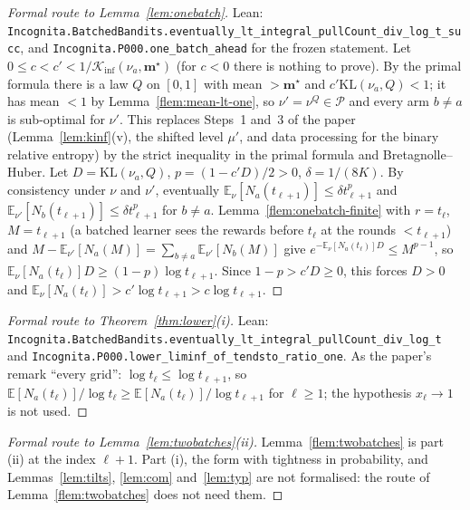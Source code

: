 \documentclass[11pt]{article}
\newcommand{\E}{\mathbb{E}}
\newcommand{\KL}{\mathrm{KL}}
\newcommand{\Kinf}{\mathcal K_{\inf}}
\newcommand{\cP}{\mathcal P}
\begin{document}
\begin{proof}[Formal route to Lemma~\ref{lem:onebatch}]
Lean: \texttt{Incognita.BatchedBandits.eventually\_lt\_integral\_pullCount\_div\_log\_t\_succ}, and
\texttt{Incognita.P000.one\_batch\_ahead} for the frozen statement. Let
$0\le c<c'<1/\Kinf(\nu_a,\mathbf m^\star)$ (for $c<0$ there is nothing to prove). By the primal
formula there is a law $Q$ on $[0,1]$ with mean $>\mathbf m^\star$ and $c'\KL(\nu_a,Q)<1$; it has
mean $<1$ by Lemma~\ref{flem:mean-lt-one}, so $\nu'=\nu^Q\in\cP$ and every arm $b\ne a$ is
sub-optimal for $\nu'$. This replaces Steps~1 and~3 of the paper (Lemma~\ref{lem:kinf}(v), the
shifted level $\mu'$, and data processing for the binary relative entropy) by the strict
inequality in the primal formula and Bretagnolle--Huber. Let $D=\KL(\nu_a,Q)$, $p=(1-c'D)/2>0$,
$\delta=1/(8K)$. By consistency under $\nu$ and $\nu'$, eventually
$\E_\nu[N_a(t_{\ell+1})]\le\delta t_{\ell+1}^p$ and $\E_{\nu'}[N_b(t_{\ell+1})]\le\delta t_{\ell+1}^p$
for $b\ne a$. Lemma~\ref{flem:onebatch-finite} with $r=t_\ell$, $M=t_{\ell+1}$ (a batched learner
sees the rewards before $t_\ell$ at the rounds $<t_{\ell+1}$) and
$M-\E_{\nu'}[N_a(M)]=\sum_{b\ne a}\E_{\nu'}[N_b(M)]$ give $e^{-\E_\nu[N_a(t_\ell)]D}\le M^{p-1}$,
so $\E_\nu[N_a(t_\ell)]D\ge(1-p)\log t_{\ell+1}$. Since $1-p>c'D\ge0$, this forces $D>0$ and
$\E_\nu[N_a(t_\ell)]>c'\log t_{\ell+1}>c\log t_{\ell+1}$.
\end{proof}

\begin{proof}[Formal route to Theorem~\ref{thm:lower}(i)]
Lean: \texttt{Incognita.BatchedBandits.eventually\_lt\_integral\_pullCount\_div\_log\_t} and
\texttt{Incognita.P000.lower\_liminf\_of\_tendsto\_ratio\_one}. As the paper's remark ``every grid'':
$\log t_\ell\le\log t_{\ell+1}$, so $\E[N_a(t_\ell)]/\log t_\ell\ge\E[N_a(t_\ell)]/\log t_{\ell+1}$ for
$\ell\ge1$; the hypothesis $x_\ell\to1$ is not used.
\end{proof}

\begin{proof}[Formal route to Lemma~\ref{lem:twobatches}(ii)]
Lemma~\ref{flem:twobatches} is part (ii) at the index $\ell+1$. Part (i), the form with tightness
in probability, and Lemmas~\ref{lem:tilts}, \ref{lem:com} and~\ref{lem:typ} are not formalised:
the route of Lemma~\ref{flem:twobatches} does not need them.
\end{proof}
\end{document}
